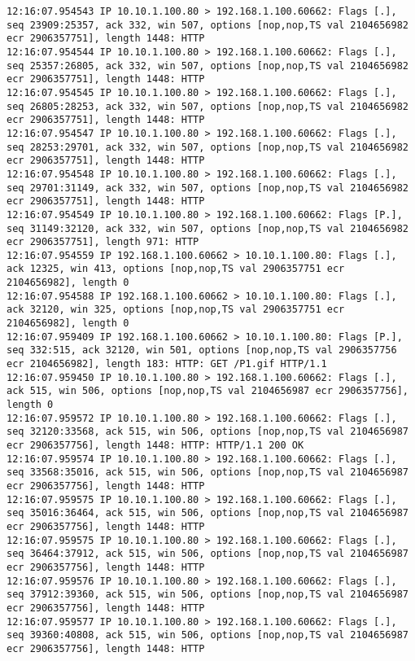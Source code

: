 \documentclass{article}
\begin{document}
{\begin{lstlisting}
12:16:07.954543 IP 10.10.1.100.80 > 192.168.1.100.60662: Flags [.], seq 23909:25357, ack 332, win 507, options [nop,nop,TS val 2104656982 ecr 2906357751], length 1448: HTTP
12:16:07.954544 IP 10.10.1.100.80 > 192.168.1.100.60662: Flags [.], seq 25357:26805, ack 332, win 507, options [nop,nop,TS val 2104656982 ecr 2906357751], length 1448: HTTP
12:16:07.954545 IP 10.10.1.100.80 > 192.168.1.100.60662: Flags [.], seq 26805:28253, ack 332, win 507, options [nop,nop,TS val 2104656982 ecr 2906357751], length 1448: HTTP
12:16:07.954547 IP 10.10.1.100.80 > 192.168.1.100.60662: Flags [.], seq 28253:29701, ack 332, win 507, options [nop,nop,TS val 2104656982 ecr 2906357751], length 1448: HTTP
12:16:07.954548 IP 10.10.1.100.80 > 192.168.1.100.60662: Flags [.], seq 29701:31149, ack 332, win 507, options [nop,nop,TS val 2104656982 ecr 2906357751], length 1448: HTTP
12:16:07.954549 IP 10.10.1.100.80 > 192.168.1.100.60662: Flags [P.], seq 31149:32120, ack 332, win 507, options [nop,nop,TS val 2104656982 ecr 2906357751], length 971: HTTP
12:16:07.954559 IP 192.168.1.100.60662 > 10.10.1.100.80: Flags [.], ack 12325, win 413, options [nop,nop,TS val 2906357751 ecr 2104656982], length 0
12:16:07.954588 IP 192.168.1.100.60662 > 10.10.1.100.80: Flags [.], ack 32120, win 325, options [nop,nop,TS val 2906357751 ecr 2104656982], length 0
12:16:07.959409 IP 192.168.1.100.60662 > 10.10.1.100.80: Flags [P.], seq 332:515, ack 32120, win 501, options [nop,nop,TS val 2906357756 ecr 2104656982], length 183: HTTP: GET /P1.gif HTTP/1.1
12:16:07.959450 IP 10.10.1.100.80 > 192.168.1.100.60662: Flags [.], ack 515, win 506, options [nop,nop,TS val 2104656987 ecr 2906357756], length 0
12:16:07.959572 IP 10.10.1.100.80 > 192.168.1.100.60662: Flags [.], seq 32120:33568, ack 515, win 506, options [nop,nop,TS val 2104656987 ecr 2906357756], length 1448: HTTP: HTTP/1.1 200 OK
12:16:07.959574 IP 10.10.1.100.80 > 192.168.1.100.60662: Flags [.], seq 33568:35016, ack 515, win 506, options [nop,nop,TS val 2104656987 ecr 2906357756], length 1448: HTTP
12:16:07.959575 IP 10.10.1.100.80 > 192.168.1.100.60662: Flags [.], seq 35016:36464, ack 515, win 506, options [nop,nop,TS val 2104656987 ecr 2906357756], length 1448: HTTP
12:16:07.959575 IP 10.10.1.100.80 > 192.168.1.100.60662: Flags [.], seq 36464:37912, ack 515, win 506, options [nop,nop,TS val 2104656987 ecr 2906357756], length 1448: HTTP
12:16:07.959576 IP 10.10.1.100.80 > 192.168.1.100.60662: Flags [.], seq 37912:39360, ack 515, win 506, options [nop,nop,TS val 2104656987 ecr 2906357756], length 1448: HTTP
12:16:07.959577 IP 10.10.1.100.80 > 192.168.1.100.60662: Flags [.], seq 39360:40808, ack 515, win 506, options [nop,nop,TS val 2104656987 ecr 2906357756], length 1448: HTTP

\end{lstlisting}}
\end{document}
